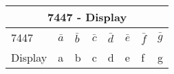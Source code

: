 \label{table:2}
\begin{tabular}{|p{3cm}|p{1cm}|p{1cm}|p{1cm}|p{1cm}|p{1cm}|p{1cm}|p{1cm}|}                                           
	\hline                                                
	\multicolumn{8}{|c|}{7447 - Display}\\                                                                    
	\hline                                                
	7447& $\bar{a}$ & $\bar{b}$ & $\bar{c}$ & $\bar{d}$ & $\bar{e}$ & $\bar{f}$ & $\bar{g}$\\                                                                    
	\hline                                                
	Display& a& b& c& d& e& f& g\\                                                                            
	\hline                                        
\end{tabular}
